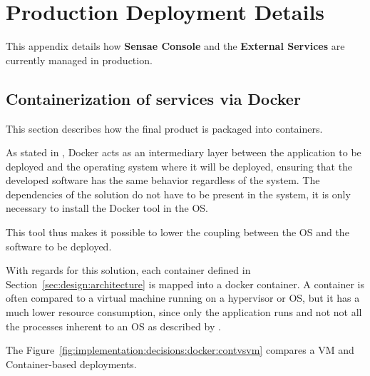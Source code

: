 \chapter{Production Deployment Details}
\label{appendix:docker}

This appendix details how \textbf{Sensae Console} and the \textbf{External Services} are currently managed in production. 

\section{Containerization of services via Docker}
\label{subsec:implementation:decisions:docker}

This section describes how the final product is packaged into containers.

As stated in , Docker acts as an intermediary layer between the application to be deployed and the operating system where it will be deployed, ensuring that the developed software has the same behavior regardless of the system. The dependencies of the solution do not have to be present in the system, it is only necessary to install the Docker tool in the \gls{OS}.

This tool thus makes it possible to lower the coupling between the \gls{OS} and the software to be deployed.

With regards for this solution, each container defined in Section~\ref{sec:design:architecture} is mapped into a docker container.
A container is often compared to a virtual machine running on a hypervisor or \gls{OS}, but it has a much lower resource consumption, since only the application runs and not not all the processes inherent to an \gls{OS} as described by \cite{bernstein2014containers}.

The Figure~\ref{fig:implementation:decisions:docker:contvsvm} compares a \gls{VM} and Container-based deployments.

